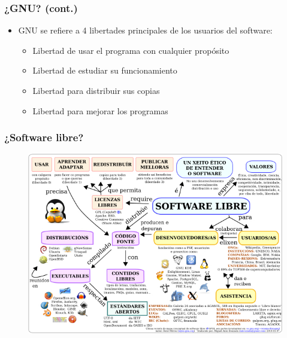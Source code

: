 \begin{frame}
	\frametitle{¿GNU? (cont.)}
	\begin{itemize}
		\item GNU se refiere a 4 libertades principales de los usuarios del software:
		\begin{itemize}
			\item Libertad de usar el programa con cualquier propósito
			\item Libertad de estudiar su funcionamiento
			\item Libertad para distribuir sus copias
			\item Libertad para mejorar los programas
		\end{itemize}
	\end{itemize}
\end{frame}

\begin{frame}
	\frametitle{¿Software libre?}
	\begin{figure}
		\centering
		\includegraphics[scale=0.3]{images/freeSoft.jpg}
	\end{figure}
\end{frame}

